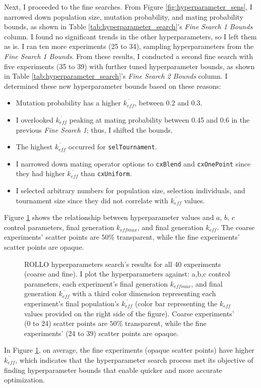 Next, I proceeded to the fine searches. 
From Figure \ref{fig:hyperparameter_sens}, I narrowed down population size, 
mutation probability, and mating probability bounds, as shown in Table 
\ref{tab:hyperparameter_search}'s \textit{Fine Search 1 Bounds} column. 
I found no significant trends in the other hyperparameters, so I left them 
as is. 
I ran ten more experiments (25 to 34), sampling hyperparameters from 
the \textit{Fine Search 1 Bounds}. 
From these results, I conducted a second fine search with five experiments 
(35 to 39) with further tuned hyperparameter bounds, as shown in Table 
\ref{tab:hyperparameter_search}'s \textit{Fine Search 2 Bounds} column. 
I determined these new hyperparameter bounds based on these reasons: 
\begin{itemize}
    \item Mutation probability has a higher $\overline{k_{eff}}$, between 0.2 and 0.3.
    \item I overlooked $\overline{k_{eff}}$  peaking at mating probability between 
    0.45 and 0.6 in the previous \textit{Fine Search 1}; thus, I shifted the bounds. 
    \item The highest $\overline{k_{eff}}$ occurred for \texttt{selTournament}. 
    \item I narrowed down mating operator options to \texttt{cxBlend} and 
    \texttt{cxOnePoint} since they had higher $\overline{k_{eff}}$ than 
    \texttt{cxUniform}. 
    \item I selected arbitrary numbers for population size, 
    selection individuals, and tournament size since they did not 
    correlate with $\overline{k_{eff}}$ values. 
\end{itemize}
Figure \ref{fig:input_hyperparameters_sens} shows the relationship between 
hyperparameter values and $a$, $b$, $c$ control parameters, final generation 
$k_{eff max}$, and final generation $\overline{k_{eff}}$. 
The coarse experiments' scatter points are $50\%$ transparent, while the fine 
experiments' scatter points are opaque. 
\begin{figure}[htbp]
    \centering
    \caption{ \acrfull{ROLLO} hyperparameters search's results for all 40 experiments 
    (coarse and fine). I plot the hyperparameters against: a,b,c control parameters, 
    each experiment's final generation $k_{eff max}$, and final generation 
    $\overline{k_{eff}}$ with a third color dimension representing each experiment's final 
    population's $\overline{k_{eff}}$ (color bar representing the $k_{eff}$ values 
    provided on the right side of the figure). Coarse experiments' (0 to 24) scatter points 
    are $50\%$ transparent, while the fine experiments' (24 to 39) scatter points 
    are opaque. }
    \label{fig:input_hyperparameters_sens}
\end{figure}
In Figure \ref{fig:input_hyperparameters_sens}, on average, the fine experiments 
(opaque scatter points) have higher $\overline{k_{eff}}$, which indicates that the
hyperparameter search process met its objective of finding hyperparameter 
bounds that enable quicker and more accurate optimization. 

